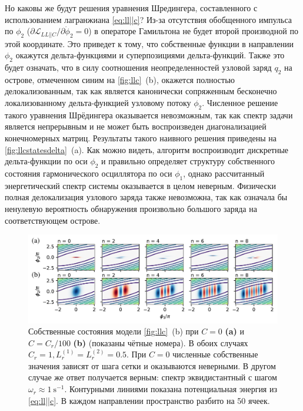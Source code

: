 \documentclass[14pt, a4paper]{extreport}
\numberwithin{equation}{section}
\begin{document}
Но каковы же будут решения уравнения Шредингера, составленного с использованием лагранжиана \eqref{eq:ll||c}? Из-за отсутствия обобщенного импульса по $\phi_2$ ($\partial \mathcal{L}_{LL||C}/\partial \dot \phi_2 = 0$) в операторе Гамильтона не будет второй производной по этой координате. Это приведет к тому, что собственные функции в направлении $\phi_2$ окажутся дельта-функциями и суперпозициями дельта-функций. Также это будет означать, что в силу соотношения неопределенностей узловой заряд $q_2$ на острове, отмеченном синим на \autoref{fig:llc}~(b), окажется полностью делокализованным, так как является канонически сопряженным бесконечно локализованному дельта-функцией узловому потоку $\phi_2$. Численное решение такого уравнения Шрёдингера оказывается невозможным, так как спектр задачи является непрерывным и не может быть воспроизведен диагонализацией конечномерных матриц. Результаты такого наивного решения приведены на \autoref{fig:llcstatesdelta}~(a). Как можно видеть, алгоритм воспроизводит дискретные дельта-функции по оси $\phi_2$ и правильно определяет структуру собственного состояния гармонического осциллятора по оси $\phi_1$, однако рассчитанный энергетический спектр системы оказывается в целом неверным. Физически полная делокализация узлового заряда также невозможна, так как означала бы ненулевую вероятность обнаружения произвольно большого заряда на соответствующем острове. 

\begin{figure}
	\includegraphics[width=\linewidth]{Pictures/llc_states}
	\caption{Собственные состояния модели \autoref{fig:llc}~(b) при $C = 0$ \textbf{(a)} и $C = C_r/100$ \textbf{(b)} (показаны чётные номера). В обоих случаях $C_r = 1, L_r^{(1)} = L_r^{(2)} = 0.5$. При $C = 0$ численные собственные значения зависят от шага сетки и оказываются неверными. В другом случае же ответ получается верным: спектр эквидистантный с шагом $\omega_r \approx 1\ \text{s}^{-1}$. Контурными линиями показана потенциальная энергия из \eqref{eq:ll||c}. В каждом направлении пространство разбито на 50 ячеек.}
	\label{fig:llcstatesdelta}
\end{figure}
\end{document}
